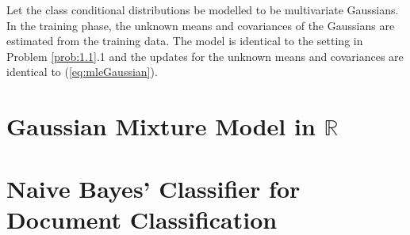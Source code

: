 \documentclass[11pt, a4 paper]{article}
\newcommand{\rr}{\mathbb{R}}
\begin{document}
\label{prob:2}

Let the class conditional distributions be modelled to be multivariate Gaussians. In the training phase, the unknown means and covariances of the Gaussians are estimated from the training data. The model is identical to the setting in Problem \ref{prob:1.1}.1 and the updates for the unknown means and covariances are identical to (\ref{eq:mleGaussian}).



\section{Gaussian Mixture Model in $\rr$}
\label{sec:gmm}

\label{prob:3}



\section{Naive Bayes' Classifier for Document Classification}
\label{sec:docClassification}


\end{document}

